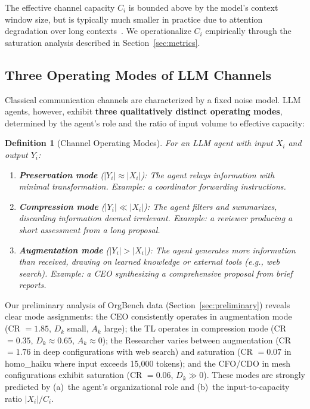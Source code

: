 \documentclass[conference]{IEEEtran}
\newtheorem{definition}{Definition}
\begin{document}
The effective channel capacity $C_i$ is bounded above by the model's context window size, but is typically much smaller in practice due to attention degradation over long contexts~\cite{liu2024lost}.
We operationalize $C_i$ empirically through the saturation analysis described in Section~\ref{sec:metrics}.

\subsection{Three Operating Modes of LLM Channels}
\label{subsec:modes}

Classical communication channels are characterized by a fixed noise model.
LLM agents, however, exhibit \textbf{three qualitatively distinct operating modes}, determined by the agent's role and the ratio of input volume to effective capacity:

\begin{definition}[Channel Operating Modes]
For an LLM agent with input $X_i$ and output $Y_i$:
\begin{enumerate}
    \item \textbf{Preservation mode} ($|Y_i| \approx |X_i|$): The agent relays information with minimal transformation. Example: a coordinator forwarding instructions.
    \item \textbf{Compression mode} ($|Y_i| \ll |X_i|$): The agent filters and summarizes, discarding information deemed irrelevant. Example: a reviewer producing a short assessment from a long proposal.
    \item \textbf{Augmentation mode} ($|Y_i| > |X_i|$): The agent generates \emph{more} information than received, drawing on learned knowledge or external tools (e.g., web search). Example: a CEO synthesizing a comprehensive proposal from brief reports.
\end{enumerate}
\end{definition}

Our preliminary analysis of OrgBench data (Section~\ref{sec:preliminary}) reveals clear mode assignments:
the CEO consistently operates in augmentation mode (CR $= 1.85$, $D_k$ small, $A_k$ large);
the TL operates in compression mode (CR $= 0.35$, $D_k \approx 0.65$, $A_k \approx 0$);
the Researcher varies between augmentation (CR $= 1.76$ in deep configurations with web search) and saturation (CR $= 0.07$ in homo\_haiku where input exceeds 15{,}000 tokens);
and the CFO/CDO in mesh configurations exhibit saturation (CR $= 0.06$, $D_k \gg 0$).
These modes are strongly predicted by (a)~the agent's organizational role and (b)~the input-to-capacity ratio $|X_i| / C_i$.
\end{document}
